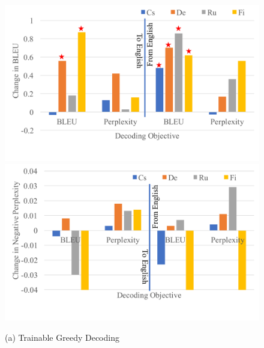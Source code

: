 \begin{figure}[htpb]
\centering
\begin{minipage}{\textwidth}
\centering

  \begin{minipage}{0.48\columnwidth}
  \centering
  \includegraphics[width=\columnwidth]{figs/trainable/greedy_bleu.pdf}
  \end{minipage}
  \hfill
  \begin{minipage}{0.48\columnwidth}
  \centering
  \includegraphics[width=\columnwidth]{figs/trainable/greedy_perplexity.pdf}
  \end{minipage}
  \label{cp7.fig.r1}
  
  (a) Trainable Greedy Decoding


\end{minipage}
\end{figure}
